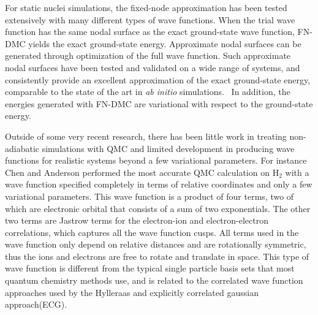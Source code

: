 \documentclass[aip,jcp,numerical,reprint]{revtex4-1}
\begin{document}
For static nuclei simulations, the fixed-node approximation has been tested extensively with many different types of wave functions.  When the trial wave function has the same nodal surface as the exact ground-state wave function, FN-DMC yields the exact ground-state energy.  Approximate nodal surfaces can be generated through optimization of the full wave function. Such approximate nodal surfaces have been tested and validated on a wide range of systems, and consistently provide an excellent approximation of the exact ground-state energy, comparable to the state of the art in \textit{ab initio} simulations.~\cite{grossman1} In addition, the energies generated with FN-DMC are variational with respect to the ground-state energy.


Outside of some very recent research, there has been little work in treating non-adiabatic simulations with QMC and limited development in producing wave functions for realistic systems beyond a few variational parameters.  For instance Chen and Anderson \cite{anderson1} performed the most accurate QMC calculation on  H$_{2}$ with a wave function specified completely in terms of relative coordinates and only a few variational parameters.  This wave function is a product of four terms, two of which are electronic orbital that consists of a sum of two exponentials.  The  other two terms are Jastrow terms for the electron-ion and electron-electron correlations, which captures all the wave function cusps.  All terms used in the wave function only depend on relative distances and are rotationally symmetric, thus the ions and electrons are free to rotate and translate in space.   This type of wave function is different from the typical single particle basis sets that most quantum chemistry methods use, and is related to the correlated wave function approaches used by the Hylleraas and explicitly correlated gaussian approach(ECG).  
\end{document}
